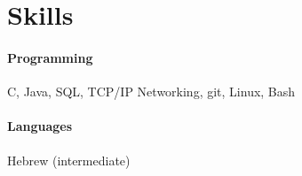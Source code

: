\documentclass[12pt]{article}
\begin{document}

\vfill
\section*{Skills}

\paragraph*{Programming}
C, Java, SQL, TCP/IP Networking, git, Linux, Bash
\paragraph*{Languages}
Hebrew (intermediate)


\end{document}
